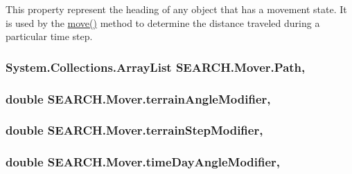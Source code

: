 This property represent the heading of any object that has a movement state. It is used by the \hyperlink{class_s_e_a_r_c_h_1_1_mover_ab2dfc659f3817ea48d66ff4d7e464d1d}{move()} method to determine the distance traveled during a particular time step. 

\hypertarget{class_s_e_a_r_c_h_1_1_mover_aaf46431549d9887e3710f2831cd906db}{
\subsubsection[{Path}]{\setlength{\rightskip}{0pt plus 5cm}System.\-Collections.\-Array\-List S\-E\-A\-R\-C\-H.\-Mover.\-Path\hspace{0.3cm}{\ttfamily [get]}, {\ttfamily [set]}}}\label{class_s_e_a_r_c_h_1_1_mover_aaf46431549d9887e3710f2831cd906db}
\hypertarget{class_s_e_a_r_c_h_1_1_mover_a64d50790add5dc402d87727fc149b8ee}{
\subsubsection[{terrain\-Angle\-Modifier}]{\setlength{\rightskip}{0pt plus 5cm}double S\-E\-A\-R\-C\-H.\-Mover.\-terrain\-Angle\-Modifier\hspace{0.3cm}{\ttfamily [get]}, {\ttfamily [set]}}}\label{class_s_e_a_r_c_h_1_1_mover_a64d50790add5dc402d87727fc149b8ee}
\hypertarget{class_s_e_a_r_c_h_1_1_mover_a09fda49c5f301e043fbe3fee2e5bf2eb}{
\subsubsection[{terrain\-Step\-Modifier}]{\setlength{\rightskip}{0pt plus 5cm}double S\-E\-A\-R\-C\-H.\-Mover.\-terrain\-Step\-Modifier\hspace{0.3cm}{\ttfamily [get]}, {\ttfamily [set]}}}\label{class_s_e_a_r_c_h_1_1_mover_a09fda49c5f301e043fbe3fee2e5bf2eb}
\hypertarget{class_s_e_a_r_c_h_1_1_mover_a1fb4ef0de58f74cdda8ba9487b4fe78c}{
\subsubsection[{time\-Day\-Angle\-Modifier}]{\setlength{\rightskip}{0pt plus 5cm}double S\-E\-A\-R\-C\-H.\-Mover.\-time\-Day\-Angle\-Modifier\hspace{0.3cm}{\ttfamily [get]}, {\ttfamily [set]}}}\label{class_s_e_a_r_c_h_1_1_mover_a1fb4ef0de58f74cdda8ba9487b4fe78c}
